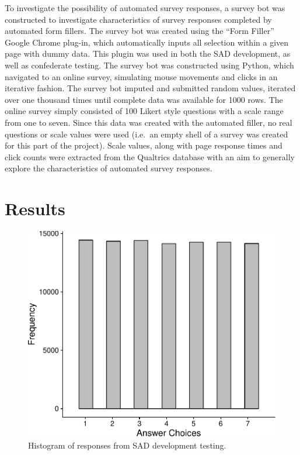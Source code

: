 \documentclass[english,man]{apa6}
\theoremstyle{definition}
\theoremstyle{definition}
\theoremstyle{definition}
\theoremstyle{remark}
\begin{document}
To investigate the possibility of automated survey responses, a survey
bot was constructed to investigate characteristics of survey responses
completed by automated form fillers. The survey bot was created using
the \enquote{Form Filler} Google Chrome plug-in, which automatically
inputs all selection within a given page with dummy data. This plugin
was used in both the SAD development, as well as confederate testing.
The survey bot was constructed using Python, which navigated to an
online survey, simulating mouse movements and clicks in an iterative
fashion. The survey bot imputed and submitted random values, iterated
over one thousand times until complete data was available for 1000 rows.
The online survey simply consisted of 100 Likert style questions with a
scale range from one to seven. Since this data was created with the
automated filler, no real questions or scale values were used (i.e.~an
empty shell of a survey was created for this part of the project). Scale
values, along with page response times and click counts were extracted
from the Qualtrics database with an aim to generally explore the
characteristics of automated survey responses.

\section{Results}\label{results}

\begin{figure}
\centering
\includegraphics{SAD_manuscript_files/figure-latex/sad-hist-1.pdf}
\caption{\label{fig:sad-hist}Histogram of responses from SAD development
testing.}
\end{figure}
\end{document}
